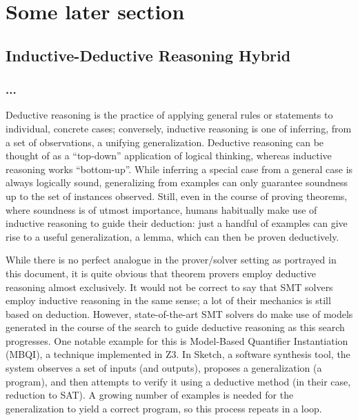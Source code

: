 \section{Some later section}

\subsection{Inductive-Deductive Reasoning Hybrid}

\subsubsection{...}

Deductive reasoning is the practice of applying general rules or statements to
individual, concrete cases; conversely, inductive reasoning is one of inferring,
from a set of observations, a unifying generalization.
Deductive reasoning can be thought of as a ``top-down'' application of logical
thinking, whereas inductive reasoning works ``bottom-up''.
While inferring a special case from a general case is always logically sound,
generalizing from examples can only guarantee soundness up to the set of
instances observed.
Still, even in the course of proving theorems, where soundness is of utmost
importance, humans habitually make use of inductive reasoning to guide their
deduction:
just a handful of examples can give rise to a useful generalization, a lemma,
which can then be proven deductively.

While there is no perfect analogue in the prover/solver setting as portrayed
in this document, it is quite obvious that theorem provers employ deductive
reasoning almost exclusively.
It would not be correct to say that SMT solvers employ inductive reasoning in
the same sense; a lot of their mechanics is still based on deduction.
However, state-of-the-art SMT solvers do make use of models generated in the
course of the search to guide deductive reasoning as this search progresses.
One notable example for this is Model-Based Quantifier Instantiation (MBQI),
a technique implemented in Z3.
In Sketch, a software synthesis tool, the system observes a set of inputs (and
outputs), proposes a generalization (a program), and then attempts to verify it
using a deductive method (in their case, reduction to SAT).
A growing number of examples is needed for the generalization to yield a correct
program, so this process repeats in a loop.

